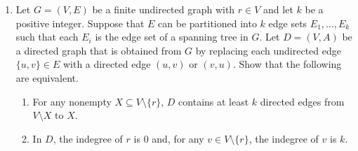 \documentclass{article}
\begin{document}
\begin{enumerate}[label=\fbox{\arabic*}]
        (A) $I$ is a loop invariant for the while loop in this program.
        
        (B) Whenever $I \wedge \neg(M < 2)$,
        \[
          (c_Z = a_0) \wedge (c_{Z+1} = a_1) \wedge \forall i.\left( 1 \le i < Z \Rightarrow (c_i \neq a_0 \vee c_{i+1} \neq a_1) \right)
        \]
        holds.

  \item %
        Let $G = (V, E)$ be a finite undirected graph with $r \in V$ and let $k$ be a positive integer. Suppose that $E$ can be partitioned into $k$ edge sets $E_1, \dots, E_k$ such that each $E_i$ is the edge set of a spanning tree in $G$. Let $D = (V, A)$ be a directed graph that is obtained from $G$ by replacing each undirected edge $\{u, v\} \in E$ with a directed edge $(u, v)$ or $(v, u)$. Show that the following are equivalent.
        \begin{enumerate}[label=(\arabic*)]
          \item For any nonempty $X \subseteq V \setminus \{r\}$, $D$ contains at least $k$ directed edges from $V \setminus X$ to $X$.
          \item In $D$, the indegree of $r$ is $0$ and, for any $v \in V \setminus \{r\}$, the indegree of $v$ is $k$.
        \end{enumerate}


\end{enumerate}
\end{document}
